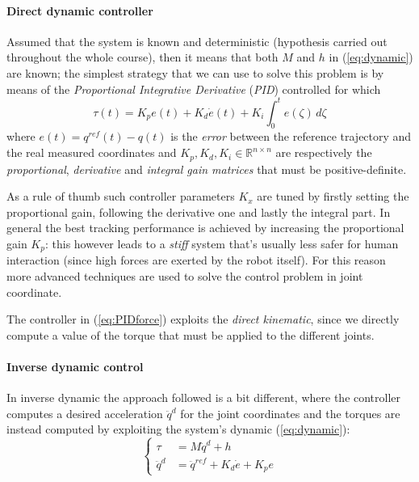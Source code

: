 	\paragraph{Direct dynamic controller} Assumed that the system is known and deterministic (hypothesis carried out throughout the whole course), then it means that both $M$ and $h$ in (\ref{eq:dynamic}) are known; the simplest strategy that we can use to solve this problem is by means of the \textit{Proportional Integrative Derivative} (\textit{PID}) controlled for which
	\begin{equation} \label{eq:PIDforce}
		\tau(t) = K_p e(t) + K_d \dot e(t) + K_i\int_0^t e(\zeta)\, d\zeta
	\end{equation}
	where $e(t) = q^{ref}(t) - q(t)$ is the \textit{error} between the reference trajectory and the real measured coordinates and $K_p,K_d,K_i \in \mathds R^{n\times n}$ are respectively the \textit{proportional}, \textit{derivative} and \textit{integral gain matrices} that must be positive-definite.
	
	As a rule of thumb such controller parameters $K_x$ are tuned by firstly setting the proportional gain, following the derivative one and lastly the integral part. In general the best tracking performance is achieved by increasing the proportional gain $K_p$: this however leads to a \textit{stiff} system that's usually less safer for human interaction (since high forces are exerted by the robot itself). For this reason more advanced techniques are used to solve the control problem in joint coordinate.
	
	The controller in (\ref{eq:PIDforce}) exploits the \textit{direct kinematic}, since we directly compute a value of the torque that must be applied to the different joints.
	
	\paragraph{Inverse dynamic control} In inverse dynamic the approach followed is a bit different, where the controller computes a desired acceleration $\ddot q^d$ for the joint coordinates and the torques are instead computed by exploiting the system's dynamic (\ref{eq:dynamic}):
	\begin{equation} \label{eq:inversedynamiccontrol}
	\begin{cases}
		\tau & = M \ddot q^d + h \\ 
		\ddot q^d &= \ddot q^{ref} + K_d \dot e + K_p e
	\end{cases}
	\end{equation}
	
